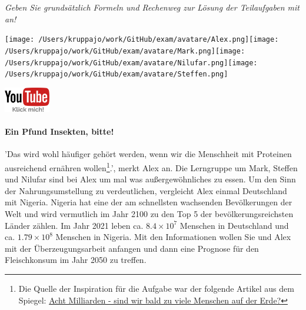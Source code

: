 \documentclass[a4paper, 9pt]{scrartcl}\usepackage[]{graphicx}\usepackage[]{xcolor}
\begin{document}
\textit{Geben Sie grundsätzlich Formeln und Rechenweg zur Lösung der Teilaufgaben mit an!} \\[1Ex]
 

 
\begin{minipage}[t]{0.5\textwidth}
\texttt{[image: /Users/kruppajo/work/GitHub/exam/avatare/Alex.png]}\hspace{-4mm}\texttt{[image: /Users/kruppajo/work/GitHub/exam/avatare/Mark.png]}\hspace{-4mm}\texttt{[image: /Users/kruppajo/work/GitHub/exam/avatare/Nilufar.png]}\hspace{-4mm}\texttt{[image: /Users/kruppajo/work/GitHub/exam/avatare/Steffen.png]}
\end{minipage}
\begin{minipage}[t]{0.5\textwidth}
\hfill
\href{https://youtu.be/OhyuH6hzEhY}{\includegraphics[width = 2cm]{img/youtube}}
\end{minipage}







\paragraph{Ein Pfund Insekten, bitte!} 'Das wird wohl häufiger gehört werden, wenn wir die Menschheit mit Proteinen ausreichend ernähren wollen\footnote{Die Quelle der Inspiration für die Aufgabe war der folgende Artikel aus dem Spiegel: \href{https://www.spiegel.de/ausland/ueberbevoelkerung-acht-milliarden-sind-wir-bald-zu-viele-menschen-auf-der-erde-a-3f20c7bc-3d60-4440-9f52-eb338db207f5}{Acht Milliarden - sind wir bald zu viele Menschen auf der Erde?}}.', merkt Alex an. Die Lerngruppe um Mark, Steffen und Nilufar sind bei Alex um mal was außergewöhnliches zu essen. Um den Sinn der Nahrungsumstellung zu verdeutlichen, vergleicht Alex einmal Deutschland mit Nigeria. Nigeria hat eine der am schnellsten wachsenden Bevölkerungen der Welt und wird vermutlich im Jahr 2100 zu den Top 5 der bevölkerungsreichsten Länder zählen. Im Jahr 2021 leben ca. \ensuremath{8.4\times 10^{7}} Menschen in Deutschland und ca. \ensuremath{1.79\times 10^{8}} Menschen in Nigeria. Mit den Informationen wollen Sie und Alex mit der Überzeugungsarbeit anfangen und dann eine Prognose für den Fleischkonsum im Jahr 2050 zu treffen. \\ 
\end{document}
